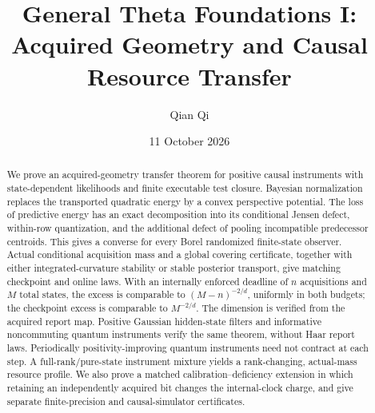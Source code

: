 \documentclass[11pt]{amsart}
\title[General Theta Foundations I]{General Theta Foundations I:\\Acquired Geometry and Causal Resource Transfer}
\author{Qian Qi}\date{11 October 2026}
\theoremstyle{definition}\newtheorem{definition}[theorem]{Definition}
\theoremstyle{remark}\newtheorem{remark}[theorem]{Remark}
\begin{document}
\raggedbottom
\begin{abstract}
We prove an acquired-geometry transfer theorem for positive causal instruments with state-dependent likelihoods and finite executable test closure. Bayesian normalization replaces the transported quadratic energy by a convex perspective potential. The loss of predictive energy has an exact decomposition into its conditional Jensen defect, within-row quantization, and the additional defect of pooling incompatible predecessor centroids. This gives a converse for every Borel randomized finite-state observer. Actual conditional acquisition mass and a global covering certificate, together with either integrated-curvature stability or stable posterior transport, give matching checkpoint and online laws. With an internally enforced deadline of $n$ acquisitions and $M$ total states, the excess is comparable to $(M-n)^{-2/d}$, uniformly in both budgets; the checkpoint excess is comparable to $M^{-2/d}$. The dimension is verified from the acquired report map. Positive Gaussian hidden-state filters and informative noncommuting quantum instruments verify the same theorem, without Haar report laws. Periodically positivity-improving quantum instruments need not contract at each step. A full-rank/pure-state instrument mixture yields a rank-changing, actual-mass resource profile. We also prove a matched calibration--deficiency extension in which retaining an independently acquired bit changes the internal-clock charge, and give separate finite-precision and causal-simulator certificates.
\end{abstract}
\maketitle









\appendix

\clearpage
\end{document}
